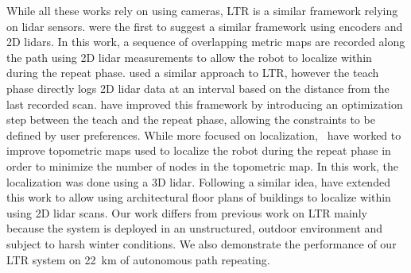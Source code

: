 While all these works rely on using cameras, \ac{LTR} is a similar framework relying on lidar sensors.
\citet{Marshall2008} were the first to suggest a similar framework using encoders and 2D lidars.
In this work, a sequence of overlapping metric maps are recorded along the path using 2D lidar measurements to allow the robot to localize within during the repeat phase.
\citet{Sprunk2013} used a similar approach to \ac{LTR}, however the teach phase directly logs 2D lidar data at an interval based on the distance from the last recorded scan.
\citet{Mazuran2015} have improved this framework by introducing an optimization step between the teach and the repeat phase, allowing the constraints to be defined by user preferences.
While more focused on localization,~\citet{Landry2016} have worked to improve topometric maps used to localize the robot during the repeat phase in order to minimize the number of nodes in the topometric map.
In this work, the localization was done using a 3D lidar. 
Following a similar idea, \citet{Boniardi2017} have extended this work to allow using architectural floor plans of buildings to localize within using 2D lidar scans.
Our work differs from previous work on \ac{LTR} mainly because the system is deployed in an unstructured, outdoor environment and subject to harsh winter conditions. 
We also demonstrate the performance of our \ac{LTR} system on \SI{22}{km} of autonomous path repeating.





